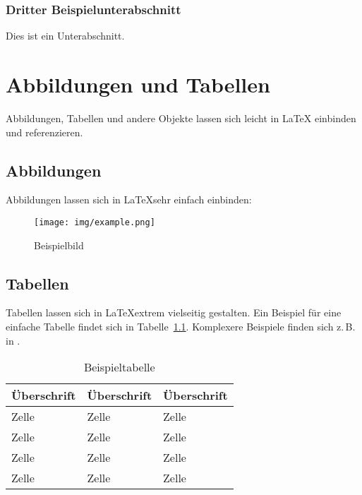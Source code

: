 \documentclass[12pt,oneside,a4paper,bibtotoc,liststotoc]{scrreprt}
\newcommand{\zB}{\mbox{z.\,B.}\xspace}
\begin{document}
\subsection{Dritter Beispielunterabschnitt}
\label{dritter_beispielunterabschnitt}

Dies ist ein Unterabschnitt.

\chapter{Abbildungen und Tabellen}

Abbildungen, Tabellen und andere Objekte lassen sich leicht in \LaTeX
einbinden und referenzieren.

\section{Abbildungen}

Abbildungen lassen sich in \LaTeX sehr einfach einbinden:

\begin{figure}[H]
  \begin{centering}
    \texttt{[image: img/example.png]}
    \caption{Beispielbild}
    \label{example_image}
  \end{centering}
\end{figure}

\section{Tabellen}

Tabellen lassen sich in \LaTeX extrem vielseitig gestalten. Ein
Beispiel für eine einfache Tabelle findet sich in
Tabelle~\ref{example_table}. Komplexere Beispiele finden sich \zB in
\cite[][]{WikibookTables}.

\begin{table}
  \centering
  \begin{tabular}{l|ll}
    \toprule
    Überschrift & Überschrift & Überschrift \\
    \midrule
    Zelle & Zelle & Zelle \\
    Zelle & Zelle & Zelle \\
    Zelle & Zelle & Zelle \\
    Zelle & Zelle & Zelle \\
    \bottomrule
  \end{tabular}
  \caption{Beispieltabelle}
  \label{example_table}
\end{table}
\end{document}
